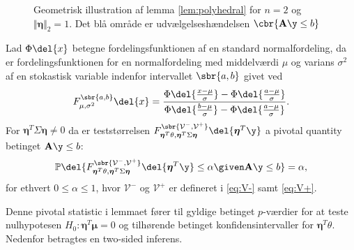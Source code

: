 %
\begin{figure}[H]
\centering
\scalebox{1}{}
\caption{Geometrisk illustration af lemma \ref{lem:polyhedral} for \(n=2\) og \(\Vert \boldsymbol{\eta} \Vert_2=1\). 
Det blå område er udvælgelseshændelsen \(\cbr{\mathbf{A} \y \leq b}\)} \label{fig:polyhedron}
\end{figure}
%
\begin{lem}  \label{lem:lem2}
Lad \(\Phi \del{x}\) betegne fordelingsfunktionen af en standard normalfordeling, da er fordelingsfunktionen for en normalfordeling med middelværdi \(\mu\) og varians \(\sigma^2\) af en stokastisk variable indenfor intervallet \(\sbr{a,b}\) givet ved
\begin{align*}
F_{\mu, \sigma^2}^{\sbr{a,b}} \del{x} = \frac{\Phi\del{\frac{x-\mu}{\sigma}} - \Phi\del{\frac{a-\mu}{\sigma}}}{\Phi\del{\frac{b-\mu}{\sigma}} - \Phi\del{\frac{a-\mu}{\sigma}}}.
\end{align*}
For \(\boldsymbol{\eta}^T \Sigma \boldsymbol{\eta} \neq 0\) da er teststørrelsen \(F_{\boldsymbol{\eta}^T \theta, \boldsymbol{\eta}^T \Sigma \boldsymbol{\eta}}^{\sbr{\mathcal{V}^-,\mathcal{V}^+}} \del{\boldsymbol{\eta}^T \y} \) a pivotal quantity betinget \(\mathbf{A} \y \leq b\):
\begin{align*}
\mathbb{P} \del{F_{\boldsymbol{\eta}^T \theta, \boldsymbol{\eta}^T \Sigma \boldsymbol{\eta}}^{\sbr{\mathcal{V}^-,\mathcal{V}^+}} \del{\boldsymbol{\eta}^T \y} \leq \alpha \given \mathbf{A} \y \leq b} = \alpha, 
\end{align*}
for ethvert \(0 \leq \alpha \leq 1\), hvor \(\mathcal{V}^-\) og \(\mathcal{V}^+\) er defineret i \eqref{eq:V-} samt \eqref{eq:V+}. 
\end{lem}
%
Denne pivotal statistic i lemmaet fører til gyldige betinget \(p\)-værdier for at teste nulhypotesen \(H_0: \boldsymbol{\eta}^T \boldsymbol{\mu}=0\) og tilhørende betinget konfidensintervaller for \(\boldsymbol{\eta}^T \theta\).
Nedenfor betragtes en two-sided inferens.
%
